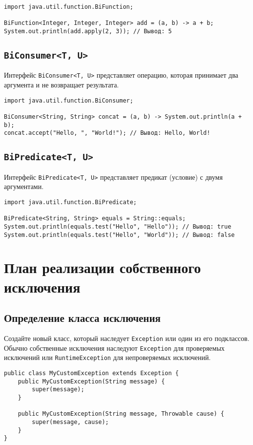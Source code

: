 \documentclass[12pt, a4paper]{article}
\begin{document}
\begin{verbatim}
import java.util.function.BiFunction;

BiFunction<Integer, Integer, Integer> add = (a, b) -> a + b;
System.out.println(add.apply(2, 3)); // Вывод: 5
\end{verbatim}

\subsection*{\texttt{BiConsumer<T, U>}}
Интерфейс \texttt{BiConsumer<T, U>} представляет операцию, которая принимает два аргумента и не возвращает результата.

\begin{verbatim}
import java.util.function.BiConsumer;

BiConsumer<String, String> concat = (a, b) -> System.out.println(a + b);
concat.accept("Hello, ", "World!"); // Вывод: Hello, World!
\end{verbatim}

\subsection*{\texttt{BiPredicate<T, U>}}
Интерфейс \texttt{BiPredicate<T, U>} представляет предикат (условие) с двумя аргументами.

\begin{verbatim}
import java.util.function.BiPredicate;

BiPredicate<String, String> equals = String::equals;
System.out.println(equals.test("Hello", "Hello")); // Вывод: true
System.out.println(equals.test("Hello", "World")); // Вывод: false
\end{verbatim}


\section{План реализации собственного исключения}

\subsection*{Определение класса исключения}
Создайте новый класс, который наследует \texttt{Exception} или один из его подклассов. Обычно собственные исключения наследуют \texttt{Exception} для проверяемых исключений или \texttt{RuntimeException} для непроверяемых исключений.

\begin{verbatim}
public class MyCustomException extends Exception {
    public MyCustomException(String message) {
        super(message);
    }

    public MyCustomException(String message, Throwable cause) {
        super(message, cause);
    }
}
\end{verbatim}
\end{document}

